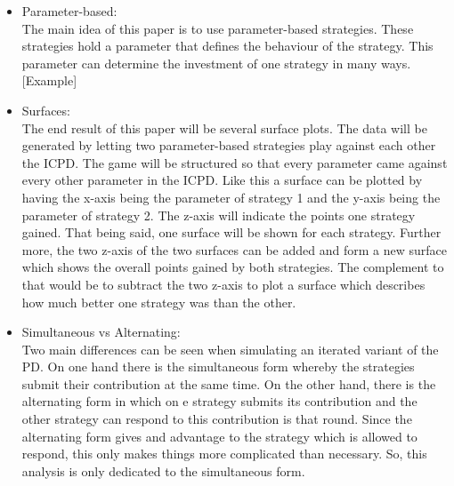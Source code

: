 \documentclass{article}
\begin{document}
\begin{itemize}

	\item Parameter-based:\\

The main idea of this paper is to use parameter-based strategies.
These strategies hold a parameter that defines the behaviour of the strategy.
This parameter can determine the investment of one strategy in many ways.
[Example]



	\item Surfaces:\\

The end result of this paper will be several surface plots.
The data will be generated by letting two parameter-based strategies play against each other the ICPD.
The game will be structured so that every parameter came against every other parameter in the ICPD.
Like this a surface can be plotted by having the x-axis being the parameter of strategy 1 and the y-axis being the parameter of strategy 2.
The z-axis will indicate the points one strategy gained.
That being said, one surface will be shown for each strategy.
Further more, the two z-axis of the two surfaces can be added and form a new surface which shows the overall points gained by both strategies.
The complement to that would be to subtract the two z-axis to plot a surface which describes how much better one strategy was than the other.


	\item Simultaneous vs Alternating:\\

Two main differences can be seen when simulating an iterated variant of the PD.
On one hand there is the simultaneous form whereby the strategies submit their contribution at the same time.
On the other hand, there is the alternating form in which on e strategy submits its contribution and the other strategy can respond to this contribution is that round.
Since the alternating form gives and advantage to the strategy which is allowed to respond, this only makes things more complicated than necessary.
So, this analysis is only dedicated to the simultaneous form.


\end{itemize}
\end{document}
